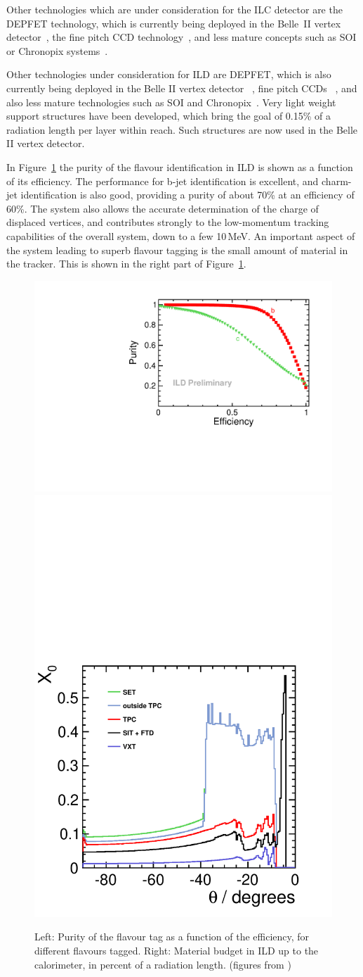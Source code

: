 \documentclass[%
 amsmath,amssymb,
 aps,
 longbibliography,
]{revtex4-1}
\begin{document}
Other technologies which are under consideration for the ILC detector are the DEPFET technology, which is currently being deployed in the Belle~II vertex detector~\cite{Luetticke:2017zpx}, the fine pitch CCD technology~\cite{fineCCD}, and less mature concepts such as SOI or Chronopix systems~\cite{RDliaision}. 


Other technologies under consideration for ILD are DEPFET, which is also currently being deployed in the Belle II vertex detector ~\cite{Luetticke:2017zpx}, fine pitch CCDs ~\cite{fineCCD}, and also less mature technologies such as SOI and Chronopix~\cite{RDliaision}.
Very light weight support structures have been developed, which bring the goal of 0.15\% of a radiation length per layer within reach. Such structures are now used in the Belle II vertex detector.

In Figure~\ref{fig-btag} the purity of the flavour identification in ILD is shown as a function of its efficiency.
The performance for b-jet identification is excellent, and charm-jet identification is also good, providing a purity of about 70\% at an efficiency of 60\%.
 The system also allows the accurate determination of the charge of displaced vertices, and contributes strongly to the low-momentum tracking capabilities of the overall system, down to a few 10\,MeV. An important aspect of the system leading to superb flavour tagging is the small amount of material in the tracker. This is shown in the right part of Figure~\ref{fig-btag}.
\begin{figure}
    \centering
    \includegraphics[width=0.45\hsize]{figures/flavour_tag_v02-00-02_btagctag.pdf}
    \includegraphics[width=0.35\hsize]{figures/material-budget-new.pdf}
    \caption{Left: Purity of the flavour tag as a function of the efficiency, for different flavours tagged. Right: Material budget in ILD up to the calorimeter, in percent of a radiation length. (figures from \cite{LCWS2018})}
    \label{fig-btag}
\end{figure}  
\end{document}
